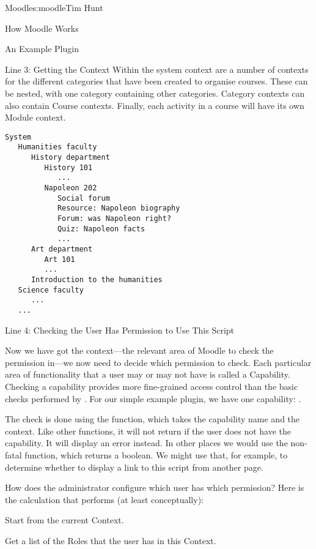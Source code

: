 \begin{aosachapter}{Moodle}{s:moodle}{Tim Hunt}
\begin{aosasect1}{How Moodle Works}
\begin{aosasect2}{An Example Plugin}
\begin{aosasect3}{Line 3: Getting the Context}
Within the system context are a number of contexts for the different
categories that have been created to organise courses. These can be
nested, with one category containing other categories. Category
contexts can also contain Course contexts. Finally, each activity in a
course will have its own Module context.

\begin{verbatim}
System
   Humanities faculty
      History department
         History 101
            ...
         Napoleon 202
            Social forum
            Resource: Napoleon biography
            Forum: was Napoleon right?
            Quiz: Napoleon facts
            ...
      Art department
         Art 101
         ...
      Introduction to the humanities
   Science faculty
      ...
   ...
\end{verbatim}

\end{aosasect3}

\begin{aosasect3}{Line 4: Checking the User Has Permission to Use This Script}

Now we have got the context---the relevant area of Moodle to check the
permission in---we now need to decide which permission to check. Each
particular area of functionality that a user may or may not have is
called a Capability. Checking a capability provides more fine-grained
access control than the basic checks performed by
. For our simple example plugin, we have one
capability: .

The check is done using the  function, which
takes the capability name and the context. Like other
 functions, it will not return if the user does
not have the capability. It will display an error instead. In other
places we would use the non-fatal  function,
which returns a boolean. We might use that, for example, to determine
whether to display a link to this script from another page.

How does the administrator configure which user has which permission?
Here is the calculation that  performs (at least
conceptually):

\begin{aosaenumerate}

\item Start from the current Context.

\item Get a list of the Roles that the user has in this Context.


\end{aosaenumerate}
\end{aosasect3}
\end{aosasect2}
\end{aosasect1}
\end{aosachapter}
